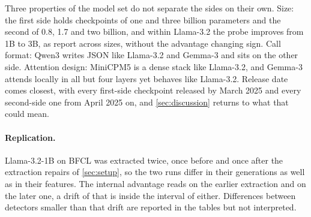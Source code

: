 Three properties of the model set do not separate the sides on their own. Size: the first side holds checkpoints of one and three billion parameters and the second of 0.8, 1.7 and two billion, and within Llama-3.2 the probe improves from 1B to 3B, as \citet{yeats2026calls} report across sizes, without the advantage changing sign. Call format: Qwen3 writes JSON like Llama-3.2 and Gemma-3 and sits on the other side. Attention design: MiniCPM5 is a dense stack like Llama-3.2, and Gemma-3 attends locally in all but four layers yet behaves like Llama-3.2. Release date comes closest, with every first-side checkpoint released by March 2025 and every second-side one from April 2025 on, and \cref{sec:discussion} returns to what that could mean.

\paragraph{Replication.} Llama-3.2-1B on BFCL was extracted twice, once before and once after the extraction repairs of \cref{sec:setup}, so the two runs differ in their generations as well as in their features. The internal advantage reads \replGapStale{} on the earlier extraction and \replGapClean{} on the later one, a drift of \replGapDelta{} that is inside the interval of either. Differences between detectors smaller than that drift are reported in the tables but not interpreted.
